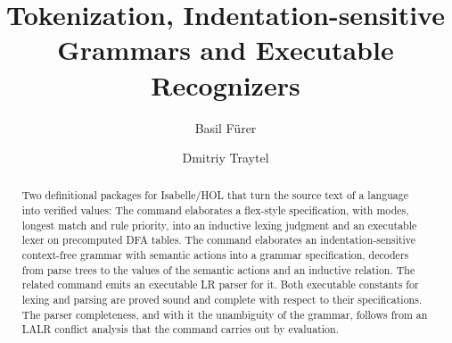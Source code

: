 \documentclass[11pt,a4paper]{article}
\begin{document}
\title{Tokenization, Indentation-sensitive Grammars and Executable Recognizers}
\author{Basil F\"urer \and Dmitriy Traytel}
\maketitle

\begin{abstract}
  Two definitional packages for Isabelle/HOL that turn the source text of a
  language into verified values: The command  elaborates a
  flex-style specification, with modes, longest match and rule priority, into an
  inductive lexing judgment and an executable lexer on precomputed DFA tables.
  The command  elaborates an indentation-sensitive context-free
  grammar with semantic actions into a grammar specification, decoders from parse
  trees to the values of the semantic actions and an inductive relation. The related
  command  emits an executable LR parser for it.
  Both executable constants for lexing and parsing are proved sound and complete
  with respect to their specifications. The parser completeness, and with it the
  unambiguity of the grammar, follows from an LALR conflict analysis that the
  command carries out by evaluation.
\end{abstract}

\newpage

\tableofcontents

\newpage



\newpage



\end{document}

